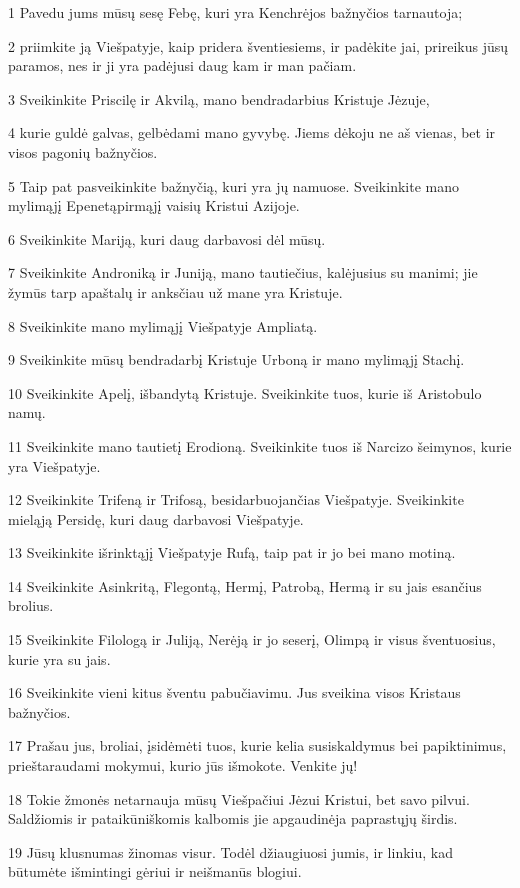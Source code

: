 \par 1 Pavedu jums mūsų sesę Febę, kuri yra Kenchrėjos bažnyčios tarnautoja; 
\par 2 priimkite ją Viešpatyje, kaip pridera šventiesiems, ir padėkite jai, prireikus jūsų paramos, nes ir ji yra padėjusi daug kam ir man pačiam. 
\par 3 Sveikinkite Priscilę ir Akvilą, mano bendradarbius Kristuje Jėzuje, 
\par 4 kurie guldė galvas, gelbėdami mano gyvybę. Jiems dėkoju ne aš vienas, bet ir visos pagonių bažnyčios. 
\par 5 Taip pat pasveikinkite bažnyčią, kuri yra jų namuose. Sveikinkite mano mylimąjį Epenetą­pirmąjį vaisių Kristui Azijoje. 
\par 6 Sveikinkite Mariją, kuri daug darbavosi dėl mūsų. 
\par 7 Sveikinkite Androniką ir Juniją, mano tautiečius, kalėjusius su manimi; jie žymūs tarp apaštalų ir anksčiau už mane yra Kristuje. 
\par 8 Sveikinkite mano mylimąjį Viešpatyje Ampliatą. 
\par 9 Sveikinkite mūsų bendradarbį Kristuje Urboną ir mano mylimąjį Stachį. 
\par 10 Sveikinkite Apelį, išbandytą Kristuje. Sveikinkite tuos, kurie iš Aristobulo namų. 
\par 11 Sveikinkite mano tautietį Erodioną. Sveikinkite tuos iš Narcizo šeimynos, kurie yra Viešpatyje. 
\par 12 Sveikinkite Trifeną ir Trifosą, besidarbuojančias Viešpatyje. Sveikinkite mieląją Persidę, kuri daug darbavosi Viešpatyje. 
\par 13 Sveikinkite išrinktąjį Viešpatyje Rufą, taip pat ir jo bei mano motiną. 
\par 14 Sveikinkite Asinkritą, Flegontą, Hermį, Patrobą, Hermą ir su jais esančius brolius. 
\par 15 Sveikinkite Filologą ir Juliją, Nerėją ir jo seserį, Olimpą ir visus šventuosius, kurie yra su jais. 
\par 16 Sveikinkite vieni kitus šventu pabučiavimu. Jus sveikina visos Kristaus bažnyčios. 
\par 17 Prašau jus, broliai, įsidėmėti tuos, kurie kelia susiskaldymus bei papiktinimus, prieštaraudami mokymui, kurio jūs išmokote. Venkite jų! 
\par 18 Tokie žmonės netarnauja mūsų Viešpačiui Jėzui Kristui, bet savo pilvui. Saldžiomis ir pataikūniškomis kalbomis jie apgaudinėja paprastųjų širdis. 
\par 19 Jūsų klusnumas žinomas visur. Todėl džiaugiuosi jumis, ir linkiu, kad būtumėte išmintingi gėriui ir neišmanūs blogiui. 
